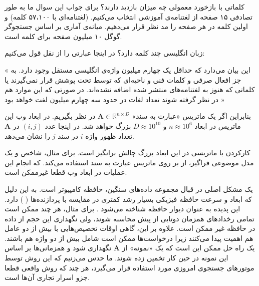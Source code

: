 کلماتی با بازخورد معمولی چه میزان بازدید دارند؟ برای جواب این سوال ما به طور تصادفی ۱۵ صفحه از لغتنامه‌‌ی آموزشی انتخاب می‌کنیم.
\cite{litez94}
(لغتنامه‌ای با ۵۷،۱۰۰ کلمه) و اولین کلمه در هر صفحه را مد نظر قرار می‌دهیم. میانه‌ی آماری بر اساس جستجو‌گر گوگل ۱۰ میلیون صفحه برای کلمه است.

زبان انگلیسی چند کلمه دارد؟ در اینجا عبارتی را از 
نقل قول می‌کنیم:

« این بیان می‌دارد که حداقل یک چهارم میلیون واژه‌ی انگلیسی مستقل وجود دارد. به جز افعال صرفی و کلمات فنی و ناحیه‌ای که توسط 
%
تحت پوشش قرار نمی‌گیرند یا کلماتی که هنوز به لغتنامه‌های منتشر شده اضافه نشده‌اند. در صورتی که این موارد هم در نظر گرفته شوند تعداد لغات در حدود سه چهارم میلیون لغت خواهد بود »

بنابراین اگر یک ماتریس «عبارت به سند» 
$\mathbf{A} \in \mathbb{R}^{n \times D}$
در نظر بگیریم. در ابعاد وب این ماتریس در ابعاد 
$n \approx 10^6$
و 
$D \approx 10^{10}$
بزرگ خواهد شد.
در اینجا عدد 
$(i,j)$
در 
$\mathbf{A}$
تعداد ظهور واژه 
$i$
در سند 
$j$
را نشان می‌دهد.

کارکردن با ماتربسی در این ابعاد بزرگ چالش برانگیز است. برای مثال، شاخص 
%
\cite{litez58}
و یک مدل موضوعی فراگیر، از 
%
بر روی ماتریس عبارت به سند استفاده می‌کند. که انجام این عملیات در ابعاد وب قطعا غیرممکن است.

یک مشکل اصلی در قبال مجموعه داده‌های سنگین، حافظه کامپیوتر است. به این دلیل که ابعاد و سرعت حافظه فیزیکی بسیار رشد کمتری در مقایسه با پردازنده‌ها (
) دارد. این پدیده به عنوان دیوار حافظه شناخته می‌شود
\cite{litez139, litez168}
. برای مثال،‌ هر چند ممکن است تمامی رخداد‌های همزمان دوتایی از پیش محاسبه شوند، ولی نگهداری این حجم از داده در حافظه غیر ممکن است. علاوه بر این، گاهی اوقات تخصیص‌‌هایی با بیش از دو عامل هم اهمیت پیدا می‌کنند زیرا درخواست‌ها ممکن است شامل بیش از دو واژه هم باشند. یک راه حل ممکن این است که یک «نمونه» از 
$\mathbf{A}$
 نگهداری شود و همزمانی‌ها بر اساس این نمونه در حین کار تخمین زده شوند. ما حدس می‌زنیم که این روش توسط موتورهای جستجوی امروزی مورد استفاده قرار می‌گیرد، هر چند که روش واقعی قطعا جزو اسرار تجاری آن‌ها است.

